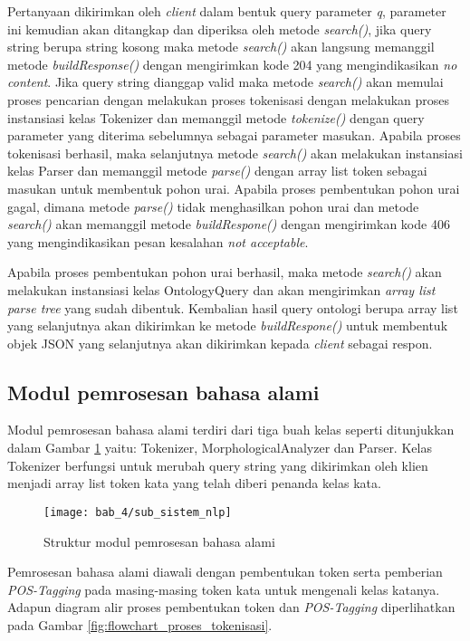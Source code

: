 Pertanyaan dikirimkan oleh \emph{client} dalam bentuk query parameter \emph{q}, parameter ini kemudian akan ditangkap dan diperiksa oleh metode \emph{search()}, jika query string berupa string kosong maka metode \emph{search()} akan langsung memanggil metode \emph{buildResponse()} dengan mengirimkan kode 204 yang mengindikasikan \emph{no content}. Jika query string dianggap valid maka metode \emph{search()} akan memulai proses pencarian dengan melakukan proses tokenisasi dengan melakukan proses instansiasi kelas Tokenizer dan memanggil metode \emph{tokenize()} dengan query parameter yang diterima sebelumnya sebagai parameter masukan. Apabila proses tokenisasi berhasil, maka selanjutnya metode \emph{search()} akan melakukan instansiasi kelas Parser dan memanggil metode \emph{parse()} dengan array list token sebagai masukan untuk membentuk pohon urai. Apabila proses pembentukan pohon urai gagal, dimana metode \emph{parse()} tidak menghasilkan pohon urai dan metode \emph{search()} akan memanggil metode \emph{buildRespone()} dengan mengirimkan kode 406 yang mengindikasikan pesan kesalahan \emph{not acceptable}.

Apabila proses pembentukan pohon urai berhasil, maka metode \emph{search()} akan melakukan instansiasi kelas OntologyQuery dan akan mengirimkan \emph{array list parse tree} yang sudah dibentuk. Kembalian hasil query ontologi berupa array list yang selanjutnya akan dikirimkan ke metode \emph{buildRespone()} untuk membentuk objek JSON yang selanjutnya akan dikirimkan kepada \emph{client} sebagai respon.

\subsection{Modul pemrosesan bahasa alami}
Modul pemrosesan bahasa alami terdiri dari tiga buah kelas seperti ditunjukkan dalam Gambar \ref{fig:sub_sistem_nlp} yaitu: Tokenizer, MorphologicalAnalyzer dan Parser. Kelas Tokenizer berfungsi untuk merubah query string yang dikirimkan oleh klien menjadi array list token kata yang telah diberi penanda kelas kata.

\begin{figure}[ht]
    \centering
    \texttt{[image: bab\_4/sub\_sistem\_nlp]}
    \caption{Struktur modul pemrosesan bahasa alami} 
    \label{fig:sub_sistem_nlp}
\end{figure}


Pemrosesan bahasa alami diawali dengan pembentukan token serta pemberian \emph{POS-Tagging} pada masing-masing token kata untuk mengenali kelas katanya. Adapun diagram alir proses pembentukan token dan \emph{POS-Tagging} diperlihatkan pada Gambar \ref{fig:flowchart_proses_tokenisasi}.

